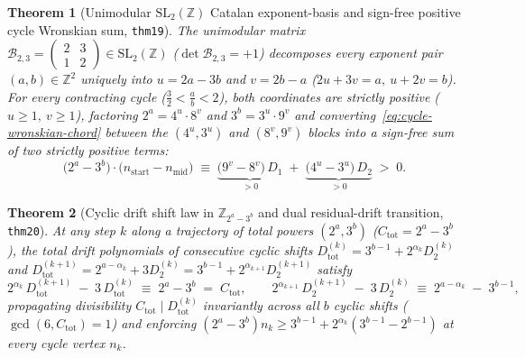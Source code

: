 \documentclass[11pt,a4paper]{article}
\newtheorem{theorem}{Theorem}[section]
\theoremstyle{definition}
\theoremstyle{remark}
\begin{document}
\begin{theorem}[Unimodular $\mathrm{SL}_2(\mathbb{Z})$ Catalan exponent-basis and sign-free positive cycle Wronskian sum, \texttt{thm19}]
\label{thm:catalan-sl2-basis}
The unimodular matrix $\mathcal{B}_{2,3} = \begin{pmatrix} 2 & 3 \\ 1 & 2 \end{pmatrix} \in \mathrm{SL}_2(\mathbb{Z})$ ($\det\mathcal{B}_{2,3} = +1$) decomposes every exponent pair $(a,b)\in\mathbb{Z}^2$ uniquely into $u = 2a - 3b$ and $v = 2b - a$ ($2u + 3v = a,\ u + 2v = b$). For every contracting cycle ($\frac{3}{2} < \frac{a}{b} < 2$), both coordinates are strictly positive ($u \ge 1,\ v \ge 1$), factoring $2^a = 4^u\cdot 8^v$ and $3^b = 3^u\cdot 9^v$ and converting~\eqref{eq:cycle-wronskian-chord} between the $(4^u,3^u)$ and $(8^v,9^v)$ blocks into a sign-free sum of two strictly positive terms:
\begin{equation}
  \label{eq:positive-wronskian-sum}
  \bigl(2^a - 3^b\bigr)\cdot\bigl(n_{\mathrm{start}} - n_{\mathrm{mid}}\bigr) \;\equiv\; \underbrace{\bigl(9^v - 8^v\bigr)\,D_1}_{> 0} \;+\; \underbrace{\bigl(4^u - 3^u\bigr)\,D_2}_{> 0} \;>\; 0.
\end{equation}
\end{theorem}

\begin{theorem}[Cyclic drift shift law in $\mathbb{Z}_{2^a - 3^b}$ and dual residual-drift transition, \texttt{thm20}]
\label{thm:dual-drift-tower}
At any step $k$ along a trajectory of total powers $(2^a, 3^b)$ ($C_{\mathrm{tot}} = 2^a - 3^b$), the total drift polynomials of consecutive cyclic shifts $D_{\mathrm{tot}}^{(k)} = 3^{b-1} + 2^{\alpha_k} D_2^{(k)}$ and $D_{\mathrm{tot}}^{(k+1)} = 2^{a - \alpha_k} + 3 D_2^{(k)} = 3^{b-1} + 2^{\alpha_{k+1}} D_2^{(k+1)}$ satisfy
\begin{equation}
  \label{eq:cyclic-drift-shift}
  2^{\alpha_k}\,D_{\mathrm{tot}}^{(k+1)} \;-\; 3\,D_{\mathrm{tot}}^{(k)} \;\equiv\; 2^a - 3^b \;=\; C_{\mathrm{tot}}, \qquad
  2^{\alpha_{k+1}}\,D_2^{(k+1)} \;-\; 3\,D_2^{(k)} \;\equiv\; 2^{a - \alpha_k} \;-\; 3^{b-1},
\end{equation}
propagating divisibility $C_{\mathrm{tot}} \mid D_{\mathrm{tot}}^{(k)}$ invariantly across all $b$ cyclic shifts ($\gcd(6, C_{\mathrm{tot}}) = 1$) and enforcing $(2^a - 3^b) n_k \ge 3^{b-1} + 2^{\alpha_k}(3^{b-1} - 2^{b-1})$ at every cycle vertex $n_k$.
\end{theorem}
\end{document}
